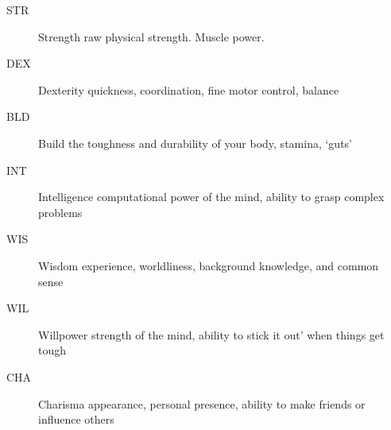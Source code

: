 \documentclass[twoside]{book}
\begin{document}
\begin{description}
    
  \item[ STR ]   Strength raw physical strength. Muscle power.
                   
  \item[ DEX ]  Dexterity quickness, coordination, fine motor
                   control, balance 
  \item[ BLD ]  Build the toughness and durability of your body,
                   stamina, `guts' 
  \item[ INT ]  Intelligence computational power of the mind,
                   ability to grasp complex problems 
  \item[ WIS ]  Wisdom experience, worldliness, background
                   knowledge, and common sense 
  \item[ WIL ]  Willpower strength of the mind, ability to
                   stick it out' when things get tough
                   
  \item[ CHA ]  Charisma appearance, personal presence, ability
                   to make friends or influence others 
\end{description}
  
    
\end{document}
